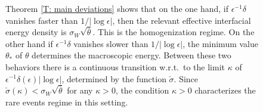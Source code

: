 \documentclass[10pt,a4paper]{amsart}
\begin{document}
\begin{figure}

\centering

	
\caption{Theorem \ref{T: main deviations} shows that on the one hand, if $ \epsilon^{-1} \delta $ vanishes faster than $1/|\log \epsilon|$, then the relevant effective interfacial energy density is $\sigma_{W} \sqrt{\bar{\theta} }$.  This is the homogenization regime.  On the other hand if $ \epsilon^{-1} \delta $ vanishes slower than $1/|\log \epsilon|$, the minimum value $\theta_{*}$ of $\theta$ determines the macroscopic energy. Between these two behaviors there is a continuous transition w.r.t.~to the limit $\kappa$ of $\epsilon^{-1} \delta(\epsilon) |\log \epsilon |$, determined by the function $\check{\sigma}$.  Since $\check{\sigma}(\kappa) < \sigma_{W} \sqrt{ \bar{\theta} }$ for any $\kappa > 0$, the condition $\kappa > 0$ characterizes the rare events regime in this setting.}

\label{fig01}

\end{figure}
\end{document}
